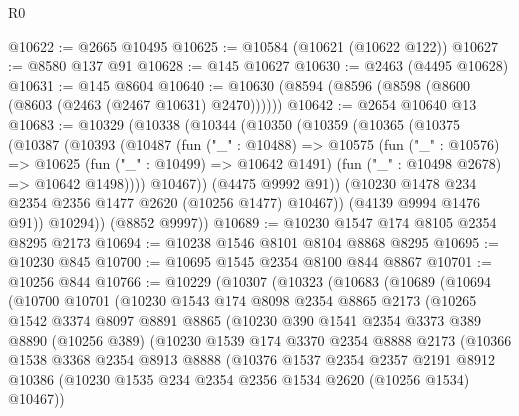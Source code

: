 \begin{lexlean}{R0}
\begin{coremodule}
@10622 := @2665 @10495
@10625 := @10584 (@10621 (@10622 @122))
@10627 := @8580 @137 @91
@10628 := @145 @10627
@10630 := @2463 (@4495 @10628)
@10631 := @145 @8604
@10640 := @10630 (@8594 (@8596 (@8598 (@8600 (@8603 (@2463 (@2467 @10631) @2470))))))
@10642 := @2654 @10640 @13
@10683 := @10329
    (@10338
      (@10344
        (@10350
          (@10359
            (@10365
              (@10375
                (@10387
                  (@10393
                    (@10487
                      (fun ("_" : @10488) =>
                      @10575
                        (fun ("_" : @10576) =>
                        @10625
                          (fun ("_" : @10499) => @10642 @1491)
                          (fun ("_" : @10498 @2678) => @10642 @1498))))
                    @10467))
                (@4475 @9992 @91))
              (@10230 @1478 @234 @2354 @2356 @1477 @2620 (@10256 @1477) @10467))
            (@4139 @9994 @1476 @91))
          @10294))
      (@8852 @9997))
@10689 := @10230 @1547 @174 @8105 @2354 @8295 @2173
@10694 := @10238 @1546 @8101 @8104 @8868 @8295
@10695 := @10230 @845
@10700 := @10695 @1545 @2354 @8100 @844 @8867
@10701 := @10256 @844
@10766 := @10229
    (@10307
      (@10323
        (@10683
          (@10689
            (@10694
              (@10700
                @10701
                (@10230
                  @1543
                  @174
                  @8098
                  @2354
                  @8865
                  @2173
                  (@10265
                    @1542
                    @3374
                    @8097
                    @8891
                    @8865
                    (@10230
                      @390
                      @1541
                      @2354
                      @3373
                      @389
                      @8890
                      (@10256 @389)
                      (@10230
                        @1539
                        @174
                        @3370
                        @2354
                        @8888
                        @2173
                        (@10366
                          @1538
                          @3368
                          @2354
                          @8913
                          @8888
                          (@10376
                            @1537
                            @2354
                            @2357
                            @2191
                            @8912
                            @10386
                            (@10230 @1535 @234 @2354 @2356 @1534 @2620 (@10256 @1534) @10467))

\end{coremodule}
\end{lexlean}
